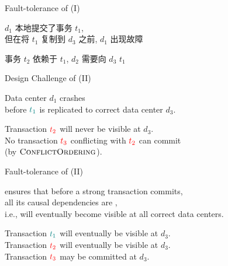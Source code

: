 \begin{frame}{Fault-tolerance of \unistore{} (I)}
  \begin{center}
    $d_{1}$ 本地提交了事务 $t_{1}$, \\[3pt]
    但在将 $t_{1}$ 复制到 $d_{3}$ 之前, $d_{1}$ 出现故障

    \vspace{0.20cm}

    \pause
    事务 $t_{2}$ 依赖于 $t_{1}$, $d_{2}$ 需要向 $d_{3}$  $t_{1}$
  \end{center}
\end{frame}

\begin{frame}{Design Challenge of \unistore{} (II)}
  \begin{center}
    Data center $d_{1}$ crashes \\[3pt]
    before $\textcolor{teal}{t_{1}}$ is replicated to correct data center $d_{3}$.

    \vspace{0.50cm}

    \pause
    \vspace{0.30cm}
    Transaction $\textcolor{red}{t_{2}}$ will never be visible at $d_{3}$. \\[3pt]
    No transaction $\textcolor{red}{t_{3}}$ conflicting with $\textcolor{red}{t_{2}}$ can commit \\
    (by $\textsc{ConflictOrdering}$).
  \end{center}
\end{frame}

\begin{frame}{Fault-tolerance of \unistore{} (II)}
  \begin{center}
    \unistore{} ensures that before a strong transaction commits, \\[3pt]
    all its causal dependencies are , \\[3pt]
    i.e., will eventually become visible at all correct data centers.

    \vspace{0.30cm}

    \pause
    Transaction $\textcolor{teal}{t_{1}}$ will eventually be visible at $d_{3}$. \\[3pt]
    Transaction $\textcolor{red}{t_{2}}$ will eventually be visible at $d_{3}$. \\[3pt]
    Transaction $\textcolor{red}{t_{3}}$ may be committed at $d_{3}$. \\[3pt]
  \end{center}
\end{frame}

